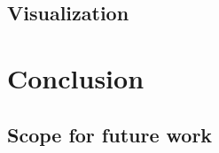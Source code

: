 \documentclass[a4paper, 12pt]{article}
\begin{document}
\subsection{Visualization}
\newpage
\section{Conclusion}
\subsection{Scope for future work}
\nocite{fontaine,gao,poorzahedy2,tianze,leblanc,kuo,poorzahedy1,wen}



\end{document}
